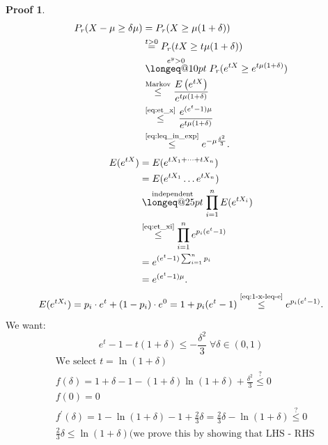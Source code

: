 \documentclass[a4paper, 12pt]{book}
\makeatletter
\theoremstyle{definition}
\newtheorem{pro}[counter]{Proof}
\theoremstyle{remark}
\newcommand{\longeq}[1]{\mathrel{\mathpalette\longeq@{#1}}}
\newcommand{\longeq@}[2]{%
  \begingroup
  \sbox\z@{$\m@th#1=$}%
  \ifdim#2<\wd\z@
    \resizebox{#2}{\height}{\box\z@}%
  \else
    \ifdim#2<3\wd\z@
      \hbox to #2{$\m@th#1=\hss=\hss=\hss=$}%
    \else
      \hbox to #2{$\m@th#1=\cleaders\hbox to 0.2\wd\z@{\hss$#1=$\hss}\hfil=$}%
    \fi
  \fi
  \endgroup
}
\makeatother
\begin{document}
\begin{pro}
  \begin{align*}
    P_r(X - \mu \geq \delta \mu) &= P_r(X \geq \mu(1+\delta)) \\
    &\stackrel{t>0}{=} P_r(tX \geq t\mu(1+\delta)) \\
    &\stackrel{e^y>0}{\longeq{10pt}} P_r(e^{tX} \geq e^{t\mu(1+\delta)}) \\
    &\stackrel{\text{Markov}}{\leq} \frac{E\left(e^{tX}\right)}{e^{t\mu(1+\delta)}} \\
    &\stackrel{\refeq{eq:et_x}}{\leq} \frac{e^{(e^t-1)\mu}}{e^{t\mu(1+\delta)}} \\
    &\stackrel{\refeq{eq:leq_in_exp}}{\leq} e^{-\mu \frac{\delta^2}{3}}.
  \end{align*}
  \begin{align}
    E(e^{tX}) &= E(e^{tX_1 + \dots + tX_n}) \nonumber \\
    &= E(e^{tX_1} \dots e^{tX_n}) \nonumber \\
    &\stackrel{\text{independent}}{\longeq{25pt}} \prod_{i=1}^{n} E(e^{tX_i}) \nonumber \\
    &\stackrel{\refeq{eq:et_xi}}{\leq} \prod_{i=1}^{n} e^{p_i(e^t-1)} \nonumber \\
    &= e^{(e^t-1) \sum_{i=1}^{n}p_i} \nonumber \\
    &= e^{(e^t-1)\mu} \label{eq:et_x}.
  \end{align}
  \begin{equation}
    E(e^{tX_i}) = p_i \cdot e^t + (1-p_i) \cdot e^0 = 1+p_i(e^t-1) \stackrel{\refeq{eq:1-x-leq-e}}{\leq} e^{p_i(e^t-1)}.
    \label{eq:et_xi}
  \end{equation}
  We want:
  \begin{equation}
    e^t - 1 - t(1+\delta) \leq -\frac{\delta^2}{3} \; \forall \delta \in (0,1) \label{eq:leq_in_exp}
  \end{equation}
  \begin{align*}
    &\text{We select }t = \ln(1+\delta) \\
    &f(\delta) = 1 + \delta - 1 - (1+\delta) \ln(1+\delta) + \frac{\delta^2}{3} \stackrel{?}{\leq} 0 \\
    &f(0) = 0 \\
    &f^{'}(\delta) = 1 - \ln(1+\delta) - 1 + \frac{2}{3} \delta = \frac{2}{3} \delta - \ln(1+\delta) \stackrel{?}{\leq} 0 \\
    &\frac{2}{3} \delta \leq \ln(1+\delta) (\text{we prove this by showing that LHS - RHS}\\

\end{align*}
\end{pro}
\end{document}
